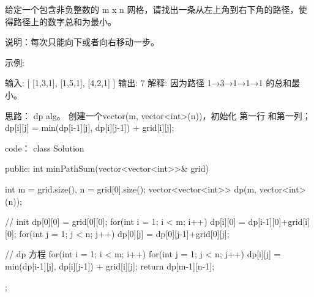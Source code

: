 给定一个包含非负整数的 m x n 网格，请找出一条从左上角到右下角的路径，使得路径上的数字总和为最小。

说明：每次只能向下或者向右移动一步。

示例:

输入:
[
  [1,3,1],
  [1,5,1],
  [4,2,1]
]
输出: 7
解释: 因为路径 1→3→1→1→1 的总和最小。



































思路：
dp alg。
创建一个vector(m, vector<int>(n))，初始化 第一行 和第一列；
dp[i][j] = min(dp[i-1][j], dp[i][j-1]) + grid[i][j];






























code：
class Solution {
public:
    int minPathSum(vector<vector<int>>& grid) {
        int m = grid.size(), n = grid[0].size();
        vector<vector<int>> dp(m, vector<int>(n));
        
        // init
        dp[0][0] = grid[0][0];
        for(int i = 1; i < m; i++)
        {
            dp[i][0] = dp[i-1][0]+grid[i][0];  
        }
        for(int j = 1; j < n; j++)
        {
            dp[0][j] = dp[0][j-1]+grid[0][j];  
        }
        
        // dp 方程
        for(int i = 1; i < m; i++)
        {
            for(int j = 1; j < n; j++)
            {
                dp[i][j] = min(dp[i-1][j], dp[i][j-1]) + grid[i][j];
            }
        }
        return dp[m-1][n-1];
    }
};
